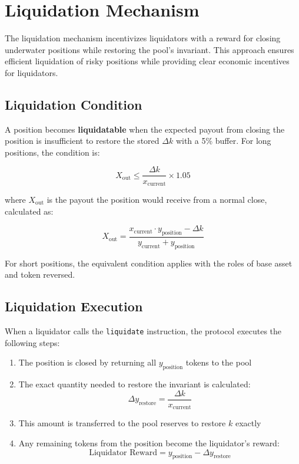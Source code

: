 \documentclass[11pt]{article}
\begin{document}
\section{Liquidation Mechanism}

The liquidation mechanism incentivizes liquidators with a reward for closing underwater positions while restoring the pool's invariant. This approach ensures efficient liquidation of risky positions while providing clear economic incentives for liquidators.

\subsection{Liquidation Condition}

A position becomes \textbf{liquidatable} when the expected payout from closing the position is insufficient to restore the stored $\Delta k$ with a 5\% buffer. For long positions, the condition is:

\begin{equation}
X_{\text{out}} \leq \frac{\Delta k}{x_{\text{current}}} \times 1.05
\end{equation}

where $X_{\text{out}}$ is the payout the position would receive from a normal close, calculated as:

\begin{equation}
X_{\text{out}} = \frac{x_{\text{current}} \cdot y_{\text{position}} - \Delta k}{y_{\text{current}} + y_{\text{position}}}
\end{equation}

For short positions, the equivalent condition applies with the roles of base asset and token reversed.

\subsection{Liquidation Execution}

When a liquidator calls the \texttt{liquidate} instruction, the protocol executes the following steps:

\begin{enumerate}
    \item The position is closed by returning all $y_{\text{position}}$ tokens to the pool
    \item The exact quantity needed to restore the invariant is calculated:
    \begin{equation}
    \Delta y_{\text{restore}} = \frac{\Delta k}{x_{\text{current}}}
    \end{equation}
    \item This amount is transferred to the pool reserves to restore $k$ exactly
    \item Any remaining tokens from the position become the liquidator's reward:
    \begin{equation}
    \text{Liquidator Reward} = y_{\text{position}} - \Delta y_{\text{restore}}
    \end{equation}
\end{enumerate}
\end{document}
